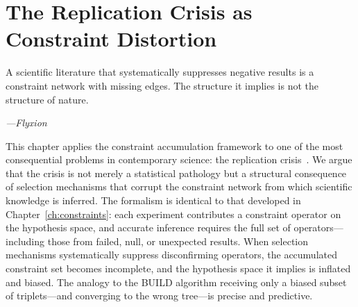 \chapter{The Replication Crisis as Constraint Distortion}
\label{ch:replication}

\epigraph{%
  A scientific literature that systematically suppresses negative results
  is a constraint network with missing edges.
  The structure it implies is not the structure of nature.%
}{\textit{---Flyxion}}

This chapter applies the constraint accumulation framework to one of the most consequential problems in contemporary science: the replication crisis~\cite{Ioannidis2005,OpenScienceCollaboration2015}. We argue that the crisis is not merely a statistical pathology but a structural consequence of selection mechanisms that corrupt the constraint network from which scientific knowledge is inferred. The formalism is identical to that developed in Chapter~\ref{ch:constraints}: each experiment contributes a constraint operator on the hypothesis space, and accurate inference requires the full set of operators---including those from failed, null, or unexpected results. When selection mechanisms systematically suppress disconfirming operators, the accumulated constraint set becomes incomplete, and the hypothesis space it implies is inflated and biased. The analogy to the BUILD algorithm receiving only a biased subset of triplets---and converging to the wrong tree---is precise and predictive.

